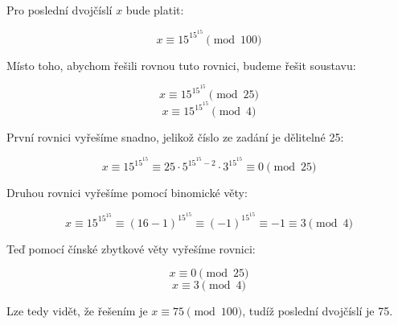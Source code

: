 \documentclass{fkssolpub}
\author{Ondřej Sedláček}
\begin{document}
Pro poslední dvojčíslí $x$ bude platit:

\[
	x \equiv 15^{15^{15}} \pmod{100}
\]

Místo toho, abychom řešili rovnou tuto rovnici, budeme řešit soustavu:

\[
	x \equiv 15^{15^{15}} \pmod{25}
\]
\[
	x \equiv 15^{15^{15}} \pmod{4}
\]

První rovnici vyřešíme snadno, jelikož číslo ze zadání je dělitelné 25:

\[
	x \equiv 15^{15^{15}} \equiv 25 \cdot 5^{15^{15} - 2} \cdot 3^{15^{15}} \equiv 0 \pmod{25}
\]

Druhou rovnici vyřešíme pomocí binomické věty:

\[
	x \equiv 15^{15^{15}} \equiv (16 - 1)^{15^{15}} \equiv (-1)^{15^{15}} \equiv -1 \equiv 3 \pmod{4}
\]

Teď pomocí čínské zbytkové věty vyřešíme rovnici:

\[
	x \equiv 0 \pmod{25}
\]
\[
	x \equiv 3 \pmod{4}
\]

Lze tedy vidět, že řešením je $x \equiv 75 \pmod{100}$, tudíž poslední dvojčíslí je 75.
\end{document}
